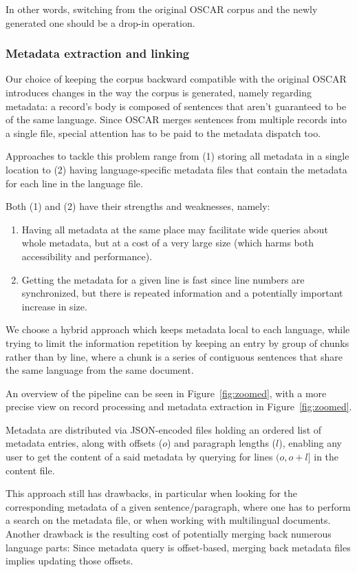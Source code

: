 In other words, switching from the original OSCAR corpus and the newly generated one should be a drop-in operation.

\subsubsection{Metadata extraction and linking}
Our choice of keeping the corpus backward compatible with the original OSCAR introduces changes in the way the corpus is generated, namely regarding metadata: a record's body is composed of sentences that aren't guaranteed to be of the same language.
Since OSCAR merges sentences from multiple records into a single file, special attention has to be paid to the metadata dispatch too.

Approaches to tackle this problem range from (1) storing all metadata in a single location to (2) having language-specific metadata files that contain the metadata for each line in the language file.

Both (1) and (2) have their strengths and weaknesses, namely:
\begin{enumerate}
    \item Having all metadata at the same place may facilitate wide queries about whole metadata, but at a cost of a very large size (which harms both accessibility and performance).
    \item Getting the metadata for a given line is fast since line numbers are synchronized, but there is repeated information and a potentially important increase in size.
\end{enumerate}

We choose a hybrid approach which keeps metadata local to each language, while trying to limit the information repetition by keeping an entry by group of chunks rather than by line, where a chunk is a series of contiguous sentences that share the same language from the same document.

An overview of the pipeline can be seen in Figure~\ref{fig:zoomed}, with a more precise view on record processing and metadata extraction in Figure~\ref{fig:zoomed}.

Metadata are distributed via JSON-encoded files holding an ordered list of metadata entries, along with offsets ($o$) and paragraph lengths ($l$), enabling any user to get the content of a said metadata by querying for lines $(o, o+l]$ in the content file.

This approach still has drawbacks, in particular when looking for the corresponding metadata of a given sentence/paragraph, where one has to perform a search on the metadata file, or when working with multilingual documents. Another drawback is the resulting cost of potentially merging back numerous language parts: Since metadata query is offset-based, merging back metadata files implies updating those offsets.

